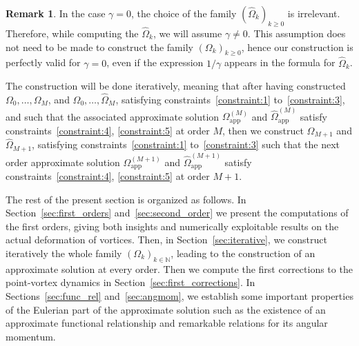 \documentclass[11pt,reqno,a4paper]{amsart}
\def\NN {\mathbb{N}}
\newcommand{\1}{\mathbbm{1}}
\theoremstyle{definition}
\newtheorem{remark}[proposition]{Remark}
\theoremstyle{definition}
\numberwithin{equation}{section}
\newcommand{\Mapp}[2]{#1^{(#2)}_\mathrm{app}}
\begin{document}
\begin{remark}\label{rem:dividebygamma}
    In the case $\gamma =0$, the choice of the family $(\widehat{\Omega}_k)_{k \ge 0}$ is irrelevant. Therefore, while computing the $\widehat{\Omega}_k$, we will assume $\gamma \neq 0$. This assumption does not need to be made to construct the family $(\Omega_k)_{k \ge 0}$, hence our construction is perfectly valid for $\gamma =0$, even if the expression $1/\gamma$ appears in the formula for $\widehat{\Omega}_k$.
\end{remark}

The construction will be done iteratively, meaning that after having constructed $\Omega_0,\ldots,\Omega_M$, and $\widehat{\Omega}_0,\ldots,\widehat{\Omega}_M$, satisfying constraints~\ref{constraint:1} to~\ref{constraint:3}, and such that the associated approximate solution $\Mapp{\Omega}{M}$ and $\Mapp{\widehat{\Omega}}{M}$ satisfy constraints~\ref{constraint:4}, \ref{constraint:5} at order $M$, then we construct $\Omega_{M+1}$ and $\widehat{\Omega}_{M+1}$, satisfying constraints~\ref{constraint:1} to~\ref{constraint:3} such that the next order approximate solution  $\Mapp{\Omega}{M+1}$ and $\Mapp{\widehat{\Omega}}{M+1}$ satisfy constraints~\ref{constraint:4}, \ref{constraint:5} at order $M+1$.

The rest of the present section is organized as follows. In Section~\ref{sec:first_orders} and~\ref{sec:second_order} we present the computations of the first orders, giving both insights and numerically exploitable results on the actual deformation of vortices. Then, in Section~\ref{sec:iterative}, we construct iteratively the whole family $(\Omega_k)_{k\in \NN}$, leading to the construction of an approximate solution at every order. Then we compute the first corrections to the point-vortex dynamics in Section~\ref{sec:first_corrections}. In Sections~\ref{sec:func_rel} and~\ref{sec:angmom}, we establish some important properties of the Eulerian part of the approximate solution such as the existence of an approximate functional relationship and remarkable relations for its angular momentum.
\end{document}
